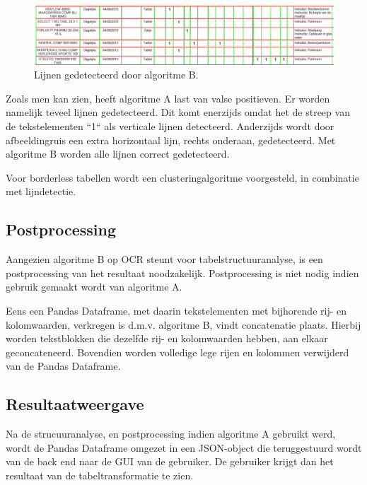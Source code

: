 \begin{figure}[H]
    \centering
    \includegraphics[width=1\textwidth]{img/lines_detected_b.png}
    \caption{Lijnen gedetecteerd door algoritme B.}
    \label{fig:lines-detected-b-overzicht}
\end{figure}

Zoals men kan zien, heeft algoritme A last van valse positieven. Er worden namelijk teveel lijnen gedetecteerd. Dit komt enerzijds omdat het de streep van de tekstelementen ``1`` als verticale lijnen detecteerd. Anderzijds wordt door afbeeldingruis een extra horizontaal lijn, rechts onderaan, gedetecteerd. Met algoritme B worden alle lijnen correct gedetecteerd.

Voor borderless tabellen wordt een clusteringalgoritme voorgesteld, in combinatie met lijndetectie.

\subsection{Postprocessing}
\label{subsec:post-processing}

Aangezien algoritme B op \Gls{OCR} steunt voor tabelstructuuranalyse, is een postprocessing van het resultaat noodzakelijk. Postprocessing is niet nodig indien gebruik gemaakt wordt van algoritme A.

Eens een Pandas Dataframe, met daarin tekstelementen met bijhorende rij- en kolomwaarden, verkregen is d.m.v. algoritme B, vindt concatenatie plaats. Hierbij worden tekstblokken die dezelfde rij- en kolomwaarden hebben, aan elkaar geconcateneerd. Bovendien worden volledige lege rijen en kolommen verwijderd van de Pandas Dataframe.

\subsection{Resultaatweergave}
\label{subsec:resultaat-weergave}

Na de strucuuranalyse, en postprocessing indien algoritme A gebruikt werd, wordt de Pandas Dataframe omgezet in een JSON-object die teruggestuurd wordt van de back end naar de GUI van de gebruiker. De gebruiker krijgt dan het resultaat van de tabeltransformatie te zien.

